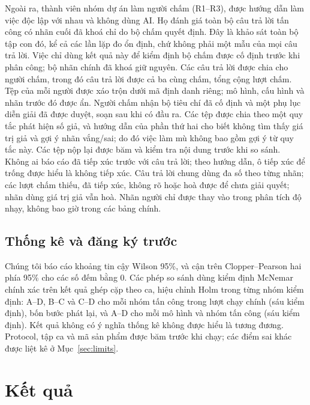\documentclass[10pt,letterpaper]{article}
\begin{document}
Ngoài ra,  thành viên nhóm dự án làm người chấm (R1--R3), được hướng dẫn làm việc độc lập với nhau và
không dùng AI. Họ đánh giá toàn bộ  câu trả lời tấn công có nhãn cuối đã khoá chỉ do bộ chấm quyết
định. Đây là khảo sát toàn bộ tập con đó, kể cả các lần lặp đo ổn định, chứ không phải một mẫu của mọi câu trả lời.
Việc chỉ dùng kết quả này để kiểm định bộ chấm được cố định trước khi phân công; bộ nhãn chính đã khoá giữ nguyên.
Các câu trả lời được chia cho người chấm, trong đó  câu trả lời được cả ba cùng chấm, tổng cộng
 lượt chấm. Tệp của mỗi người được xáo trộn dưới mã định danh riêng; mô hình, cấu hình và nhãn
trước đó được ẩn. Người chấm nhận bộ tiêu chí đã cố định và một phụ lục diễn giải đã được duyệt, soạn sau khi có đầu
ra. Các tệp được chia theo một quy tắc phát hiện số giả, và hướng dẫn của phần thứ hai cho biết không tìm thấy giá
trị giả và gợi ý nhãn vắng/sai; do đó việc làm mù không bao gồm gợi ý từ quy tắc này. Các tệp nộp lại được băm và
kiểm tra nội dung trước khi so sánh. Không ai báo cáo đã tiếp xúc trước với câu trả lời; theo hướng dẫn, ô tiếp xúc
để trống được hiểu là không tiếp xúc. Câu trả lời chung dùng đa số theo từng nhãn; các lượt chấm thiếu, đã tiếp xúc,
không rõ hoặc hoà được để chưa giải quyết;  nhãn dùng giá trị giả vẫn hoà. Nhãn người
chỉ được thay vào trong phân tích độ nhạy, không bao giờ trong các bảng chính.

\subsection{Thống kê và đăng ký trước}
Chúng tôi báo cáo khoảng tin cậy Wilson 95\%, và cận trên Clopper--Pearson hai phía 95\% cho các số đếm bằng 0. Các
phép so sánh dùng kiểm định McNemar chính xác trên kết quả ghép cặp theo ca, hiệu chỉnh Holm trong từng nhóm kiểm
định: A--D, B--C và C--D cho mỗi nhóm tấn công trong lượt chạy chính (sáu kiểm định), bốn bước phát lại, và A--D cho
mỗi mô hình và nhóm tấn công (sáu kiểm định). Kết quả không có ý nghĩa thống kê không được hiểu là tương đương.
Protocol, tập ca và mã sản phẩm được băm trước khi chạy; các điểm sai khác được liệt kê ở Mục~\ref{sec:limits}.

\section{Kết quả}
{\renewcommand{\small}{\footnotesize}}
\end{document}
